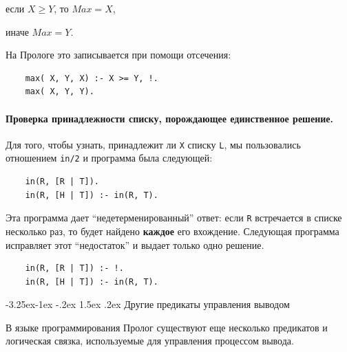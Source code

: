 \documentclass[12pt, openany, twoside]{book} %
\makeatletter
\renewcommand\subsection{\@startsection{subsection}{2}{\z@}%
                                     {-3.25ex\@plus -1ex \@minus -.2ex}%
                                     {1.5ex \@plus .2ex}%
                                     {\normalfont\normalsize\bfseries}}
\makeatother
\begin{document}
если $X \geq Y$, то $Max = X$,

иначе $Max = Y$.

На Прологе это записывается при помощи отсечения:
{\tt \begin{verbatim}
    max( X, Y, X) :- X >= Y, !.
    max( X, Y, Y).
\end{verbatim}}

\paragraph{Проверка принадлежности списку, порождающее един\-ствен\-ное
решение.} Для того, чтобы узнать, принадлежит ли {\tt X} списку {\tt L}, мы пользовались отношением {\tt in/2} и программа была следующей:
{\tt \begin{verbatim}
    in(R, [R | Т]).
    in(R, [H | Т]) :- in(R, T).
\end{verbatim}}

\noindent Эта программа дает ``недетерменированный'' ответ: если {\tt R} встречается в списке несколько раз, то будет найдено {\bf каждое} его вхождение. Следующая программа исправляет этот ``недостаток'' и выдает только одно решение.
{\tt \begin{verbatim}
    in(R, [R | Т]) :- !.
    in(R, [H | Т]) :- in(R, T).
\end{verbatim}}

\subsection{Другие предикаты управления выводом}

В языке программирования Пролог существуют еще несколько предикатов и логическая связка, используемые для управления процессом вывода.
\end{document}
